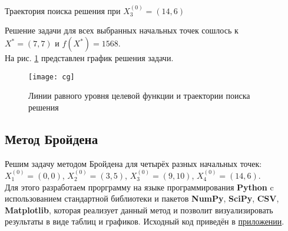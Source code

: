 \begin{table}[H]
\begin{center}
	\caption{Траектория поиска решения при $X_3^{(0)} = (14, 6)$}
	\label{tab:trajectory-cg-3}
	\def\tabcolsep{10pt}
	\def\arraystretch{1.23}
	\fontsize{13}{14}\selectfont
\end{center}
\end{table}

Решение задачи для всех выбранных начальных точек сошлось к\\ $X^* = (7, 7)$ и $f(X^*) = 1568$.\\

На рис. \ref{pic:cg} представлен график решения задачи.

\begin{figure}[H]
\begin{center}
	\texttt{[image: cg]}
	\caption{Линии равного уровня целевой функции и траектории поиска решения}
	\label{pic:cg}
\end{center}
\end{figure}

\subsection{Метод Бройдена}

Решим задачу методом Бройдена для четырёх разных начальных точек: $X_1^{(0)} = (0, 0)$, $X_2^{(0)} = (3, 5)$, $X_3^{(0)} = (9, 10)$, $X_4^{(0)} = (14, 6)$.\\

Для этого разработаем прорграмму на языке программирования \textbf{Python} c использованием стандартной библиотеки и пакетов \textbf{NumPy}, \textbf{SciPy}, \textbf{CSV}, \textbf{Matplotlib}, которая реализует данный метод и позволит визуализировать результаты в виде таблиц и графиков.  Исходный код приведён в \hyperref[sec:application]{приложении}.\\

